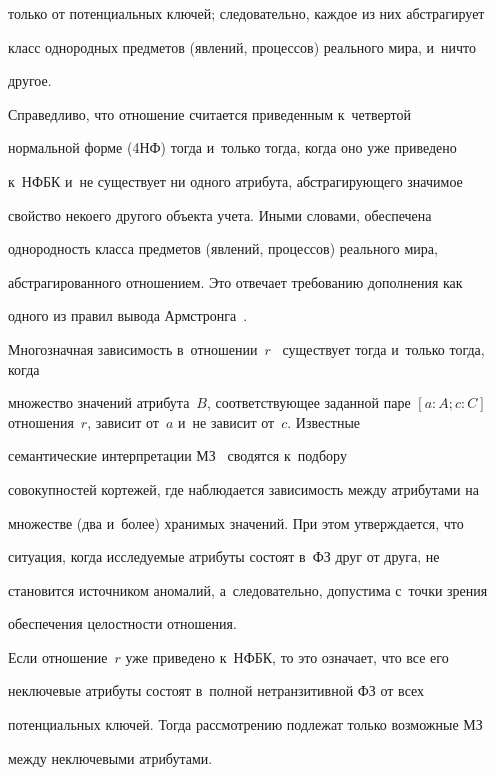 только от потенциальных ключей; следовательно, каж\-дое из них абстрагирует 

класс однородных предметов (явлений, процессов) реального мира, и~ничто 

другое.

  

  Справедливо, что отношение считается приведенным к~четвертой 

нормальной форме (4НФ) тогда и~только тогда, когда оно уже приведено 

к~НФБК и~не существует ни одного атрибута, абстра\-ги\-ру\-юще\-го значимое 

свойство некоего другого объекта учета. Иными словами, обеспечена 

однородность класса предметов (явлений, процессов) реального мира, 

абстрагированного отношением. Это отвечает требованию дополнения как 

одного из правил вывода Армстронга~\cite{19-iv, 20-iv}.

  

  Многозначная зависимость в~отношении~$r$~\cite{20-iv} существует тогда и~только тогда, когда 

множество значений атрибута~$B$, со\-от\-вет\-ст\-ву\-ющее заданной паре $[a: A; 

c:C]$ отношения~$r$, зависит от~$a$ и~не зависит от~$c$. Известные 

семантические интерпретации МЗ~\cite{13-iv} сводятся к~подбору 

совокупностей кортежей, где наблюдается за\-ви\-си\-мость меж\-ду атрибутами на 

множестве (два и~более) хранимых значений. При этом утверж\-да\-ет\-ся, что 

ситуация, когда ис\-сле\-ду\-емые атрибуты состоят в~ФЗ друг от друга, не 

становится источником аномалий, а~следовательно, допустима с~точки зрения 

обеспечения це\-лост\-ности отношения.

  

  Если отношение~$r$ уже приведено к~НФБК, то это означает, что все его 

неключевые атрибуты состоят в~пол\-ной нетранзитивной ФЗ от всех 

потенциальных ключей. Тогда рас\-смот\-ре\-нию подлежат только воз\-мож\-ные МЗ 

между неключевыми атрибутами.

